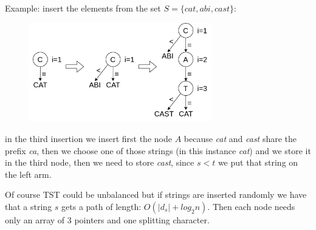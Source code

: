 Example: insert the elements from the set $S = \{ cat, abi, cast \}$:
\begin{figure}[H]
    \centering
    \includegraphics[width=300px]{images/5_String_sorting/TST_example_1.png}
\end{figure}
in the third insertion we insert first the node $A$ because \emph{cat} and \emph{cast} share the prefix \emph{ca}, then we choose one of those strings (in this instance \emph{cat}) and we store it in the third node, then we need to store \emph{cast}, since $s < t$ we put that string on the left arm.

Of course TST could be unbalanced but if strings are inserted randomly we have that a string $s$ gets a path of length: $O(|d_s| + log_2 n)$.
Then each node needs only an array of 3 pointers and one splitting character.
